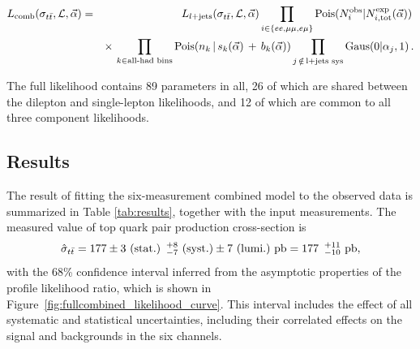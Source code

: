 
\begin{eqnarray} \label{Eq:combinedlikelihood} \nonumber
  L_{\text{comb}}(\sigma_{t\bar{t}}, {\cal L}, \vec{\alpha}) &=& L_{l+\rm jets}(\sigma_{t\bar{t}},{\cal L}, \vec{\alpha})  \prod_{i\in \{ ee,\mu\mu,e\mu\} } 
   \text{Pois}(N^{\text{obs}}_i | N^{\text{exp}}_{i, \text{tot}}(\vec{\alpha}) ) \, \\ \nonumber 
   & & \times \,  \prod_{k\in \text{all-had bins}} \text{Pois}(n_{k} \,|\, s_{k}(\vec{\alpha}) \,+\, b_{k}(\vec{\alpha})) 
     \prod_{j \, \notin \, \text{l+jets sys} } \text{Gaus}( 0 | \alpha_{j}, 1) \, . \\
\end{eqnarray}


The full likelihood contains 89 parameters in all, 26 of which are shared between the dilepton and single-lepton likelihoods, and 12 of which are common to all three component likelihoods.





\subsection{Results}
\label{sec:results}

The result of fitting the six-measurement combined model to the observed data is summarized in Table \ref{tab:results}, 
together with the input measurements.
The measured value of top quark pair production cross-section is
\begin{equation}
\hat\sigma_{t\bar{t}} =  177 \pm 3~\textrm{(stat.)} \hspace{ 5 pt } {}^{+8}_{-7}~\textrm{(syst.)} \pm 7~\textrm{(lumi.)}~\textrm{pb} = 177 \hspace{ 5 pt } {}^{+11}_{-10}~\textrm{pb}, \nonumber
\end{equation}
with the 68\% confidence interval inferred from the asymptotic properties of the profile likelihood ratio, which is shown in Figure~\ref{fig:fullcombined_likelihood_curve}.  
This interval includes the effect of all systematic and statistical uncertainties, including their correlated effects on the signal and backgrounds in the six channels.  

